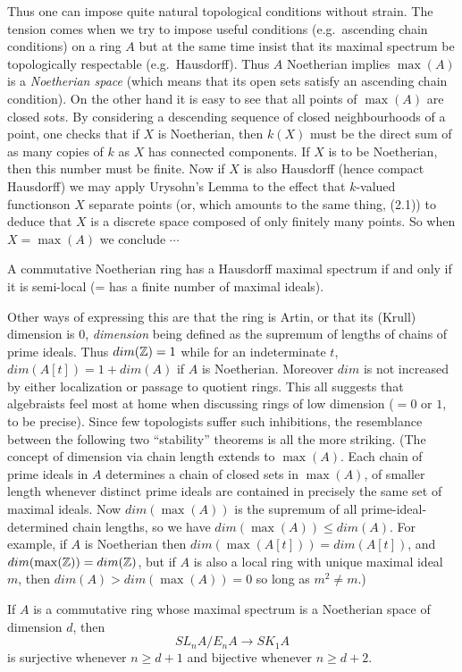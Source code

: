 Thus one can impose quite natural topological conditions without strain. The tension comes when we try to impose useful conditions (e.g.\  ascending chain conditions) on a ring $A$ but at the same time insist that its maximal spectrum be topologically respectable (e.g.\ Hausdorff). Thus $A$ Noetherian implies $\max(A)$ is a {\em Noetherian space} (which means that its open sets satisfy an ascending chain condition). On the other hand it is easy to see that all points of $\max(A)$ are closed sots. By considering a descending sequence of closed neighbourhoods of a point, one checks that if $X$ is Noetherian, then $k(X)$ must be the direct sum of as many copies of $k$ as $X$ has connected components. If $X$ is to be Noetherian, then this number must be finite. Now if $X$ is also Hausdorff (hence compact Hausdorff) we may apply Urysohn's Lemma to the effect that $k$-valued functionson $X$ separate points (or, which amounts to the same thing, (2.1)) to deduce that $X$ is a discrete space composed of only finitely many points. So when $X=\max(A)$ we conclude $\cdots$
\begin{prop}
A commutative Noetherian ring has a Hausdorff maximal spectrum if and only if it is semi-local (= has a finite number of maximal ideals).
\end{prop}

Other ways of expressing this are that the ring is Artin, or that its (Krull) dimension is $0$, {\em dimension} being defined as the supremum of lengths of chains of prime ideals. Thus $dim(\mathbb{Z})=1$ while for an indeterminate $t$, $dim(A[t])=1+dim(A)$ if $A$ is Noetherian. Moreover $dim$ is not increased by either localization or passage to quotient rings. This all suggests that algebraists feel most at home when discussing rings of low dimension ($=0$ or $1$, to be precise). Since few topologists suffer such inhibitions, the resemblance between the following two ``stability'' theorems is all the more striking. (The concept of dimension via chain length extends to $\max(A)$.
Each chain of prime ideals in $A$ determines a chain of closed sets in $\max(A)$, of smaller length whenever distinct prime ideals are contained in precisely the same set of maximal ideals. Now $dim(\max(A))$ is the supremum of all prime-ideal-determined chain lengths, so we have $dim(\max(A))\leqslant dim(A)$. For example, if $A$ is Noetherian then $dim(\max(A[t]))=dim(A[t])$, and $dim(\max(\mathbb{Z}))=dim(\mathbb{Z})$, but if $A$ is also a local ring with unique maximal ideal $m$, then
$dim(A)>dim(\max(A))=0$ so long as $m^2\neq m$.)
\begin{theorem}
If $A$ is a commutative ring whose maximal spectrum is a Noetherian space of dimension $d$, then
\[SL_nA/E_nA\longrightarrow SK_1A\]
is surjective whenever $ n\geqslant d+1$ and bijective whenever $n\geqslant d+2$.
\end{theorem}

